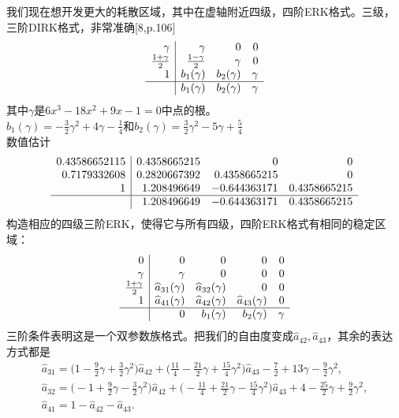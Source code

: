 \documentclass[12pt,a4paper]{article}
\begin{document}
我们现在想开发更大的耗散区域，其中在虚轴附近四级，四阶ERK格式。三级，三阶DIRK格式，非常准确[8,p.106]
\[
\begin{array}{r|rrr}
\gamma & \gamma & 0 & 0\\
\frac{1+\gamma }{2} & \frac{1-\gamma }{2} & \gamma  & 0 \\
1 & b_{1}(\gamma ) &  b_{2}(\gamma ) & \gamma \\
\hline
&  b_{1}(\gamma ) &  b_{2}(\gamma ) &\gamma
\end{array}
\]
其中$\gamma$是$6x^3-18x^2+9x-1=0$中点的根。\\
$b_{1}(\gamma)=-\frac{3}{2}\gamma^2+4\gamma-\frac{1}{4}$和$b_{2}(\gamma)=\frac{3}{2}\gamma^2-5\gamma+\frac{5}{4}$\\
数值估计
\[
\begin{array}{r|rrr}
0.43586652115 & 0.4358665215 & 0 & 0\\
0.7179332608 &0.2820667392 & 0.4358665215 & 0\\
1 & 1.208496649 & -0.644363171 & 0.4358665215 \\
\hline
& 1.208496649 & -0.644363171 & 0.4358665215
\end{array}
\]
构造相应的四级三阶ERK，使得它与所有四级，四阶ERK格式有相同的稳定区域：
\[
\begin{array}{r|rrrr}
0 & 0 & 0 & 0 & 0 \\
\gamma & \gamma & 0 & 0 & 0\\
\frac{1+\gamma}{2} & \widehat{a}_{31}(\gamma) & \widehat{a}_{32}(\gamma) & 0 & 0\\
1 & \widehat{a}_{41}(\gamma) & \widehat{a}_{42}(\gamma) & \widehat{a}_{43}(\gamma) & 0\\
\hline
& 0 & b_{1}(\gamma) & b_{2}(\gamma) & \gamma 
\end{array}
\]
三阶条件表明这是一个双参数族格式。把我们的自由度变成$\widehat{a}_{42},\widehat{a}_{43}$，其余的表达方式都是
\begin{gather}
\widehat{a}_{31}=\bigg(1-\frac{9}{2}\gamma+\frac{3}{2}\gamma^2\biggl)\widehat{a}_{42}+\bigg(\frac{11}{4}-\frac{21}{2}\gamma+\frac{15}{4}\gamma^2\biggl)\widehat{a}_{43}-\frac{7}{2}+13\gamma-\frac{9}{2}\gamma^2,\\
\widehat{a}_{32}=\bigg (-1+\frac{9}{2}\gamma-\frac{3}{2}\gamma^2\biggl)\widehat{a}_{42}+\bigg(-\frac{11}{4}+\frac{21}{2}\gamma-\frac{15}{4}\gamma^2\biggl)\widehat{a}_{43}+4-\frac{25}{2}\gamma+\frac{9}{2}\gamma^2,\\
\widehat{a}_{41}=1-\widehat{a}_{42}-\widehat{a}_{43}.
\end{gather}
\end{document}
